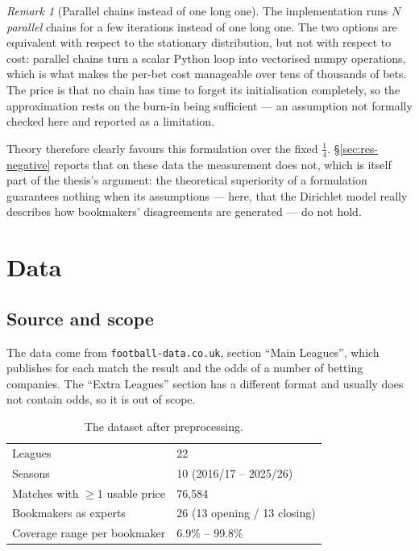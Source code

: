 \documentclass[12pt,a4paper,oneside]{report}
\newcommand{\file}[1]{\texttt{#1}}
\renewcommand{\_}{\oldunderscore\allowbreak}
\theoremstyle{definition}
\theoremstyle{plain}
\theoremstyle{remark}
\newtheorem{remark}[theorem]{Remark}
\begin{document}
\begin{remark}[Parallel chains instead of one long one]
The implementation runs $N$ \emph{parallel} chains for a few iterations instead of one long one.
The two options are equivalent with respect to the stationary distribution, but not with respect
to cost: parallel chains turn a scalar Python loop into vectorised numpy operations, which is
what makes the per-bet cost manageable over tens of thousands of bets. The price is that no chain
has time to forget its initialisation completely, so the approximation rests on the burn-in being
sufficient --- an assumption not formally checked here and reported as a limitation.
\end{remark}

Theory therefore clearly favours this formulation over the fixed $\tfrac14$.
\S\ref{sec:res-negative} reports that on these data the measurement does not, which is itself
part of the thesis's argument: the theoretical superiority of a formulation guarantees nothing
when its assumptions --- here, that the Dirichlet model really describes how bookmakers'
disagreements are generated --- do not hold.

\chapter{Data}
\label{ch:data}

\section{Source and scope}

The data come from \file{football-data.co.uk}, section ``Main Leagues'', which publishes for each
match the result and the odds of a number of betting companies. The ``Extra Leagues'' section has
a different format and usually does not contain odds, so it is out of scope.

\begin{table}[H]
\centering
\begin{tabular}{@{}ll@{}}
\toprule
Leagues & 22 \\
Seasons & 10 (2016/17 -- 2025/26) \\
Matches with $\geq$1 usable price & 76,584 \\
Bookmakers as experts & 26 (13 opening / 13 closing) \\
Coverage range per bookmaker & 6.9\% -- 99.8\% \\
\bottomrule
\end{tabular}
\caption{The dataset after preprocessing.}
\end{table}
\end{document}
